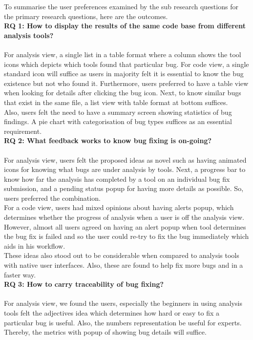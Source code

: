 To summarise the user preferences examined by the sub research questions for the primary research questions, here are the outcomes. \\

\noindent \textbf{RQ 1: How to display the results of the same code base from different analysis tools?} \\ \\
For analysis view, a single list in a table format where a column shows the tool icons which depicts which tools found that particular bug. For code view, a single standard icon will suffice as users in majority felt it is essential to know the bug existence but not who found it. Furthermore, users preferred to have a table view when looking for details after clicking the bug icon. Next, to know similar bugs that exist in the same file, a list view with table format at bottom suffices. \\

Also, users felt the need to have a summary screen showing statistics of bug findings. A pie chart with categorisation of bug types suffices as an essential requirement. \\


\noindent \textbf{RQ 2: What feedback works to know bug fixing is on-going?} \\ \\
For analysis view, users felt the proposed ideas as novel such as having animated icons for knowing what bugs are under analysis by tools. Next, a progress bar to know how far the analysis has completed by a tool on an individual bug fix submission, and a pending status popup for having more details as possible. So, users preferred the combination. \\

For a code view, users had mixed opinions about having alerts popup, which determines whether the progress of analysis when a user is off the analysis view. However, almost all users agreed on having an alert popup when tool determines the bug fix is failed and so the user could re-try to fix the bug immediately which aids in his workflow. \\

These ideas also stood out to be considerable when compared to analysis tools with native user interfaces. Also, these are found to help fix more bugs and in a faster way. \\
	
\noindent \textbf{RQ 3: How to carry traceability of bug fixing?} \\ \\
For analysis view, we found the users, especially the beginners in using analysis tools felt the adjectives idea which determines how hard or easy to fix a particular bug is useful. Also, the numbers representation be useful for experts. Thereby, the metrics with popup of showing bug details will suffice. \\

